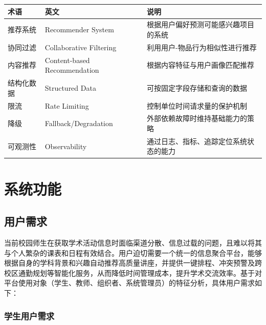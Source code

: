 \documentclass[UTF8,a4paper,12pt,fontset=none]{ctexrep}
\begin{document}
\begingroup
\small
\begin{longtable}{|>{\raggedright\arraybackslash}p{}|>{\raggedright\arraybackslash}p{}|>{\raggedright\arraybackslash}p{}|}
\hline
\textbf{术语} & \textbf{英文} & \textbf{说明} \\
\hline
推荐系统 & Recommender System & 根据用户偏好预测可能感兴趣项目的系统 \\
\hline
协同过滤 & Collaborative Filtering & 利用用户-物品行为相似性进行推荐 \\
\hline
内容推荐 & Content-based Recommendation & 根据内容特征与用户画像匹配推荐 \\
\hline
结构化数据 & Structured Data & 可按固定字段存储和查询的数据 \\
\hline
限流 & Rate Limiting & 控制单位时间请求量的保护机制 \\
\hline
降级 & Fallback/Degradation & 外部依赖故障时维持基础能力的策略 \\
\hline
可观测性 & Observability & 通过日志、指标、追踪定位系统状态的能力 \\
\hline
\end{longtable}
\endgroup

\chapter{系统功能}

\section{用户需求}

当前校园师生在获取学术活动信息时面临渠道分散、信息过载的问题，且难以将其与个人繁杂的课表和日程有效结合。用户迫切需要一个统一的信息聚合平台，能够根据自身的学科背景和兴趣自动推荐高质量讲座，并提供一键排程、冲突预警及跨校区通勤规划等智能化服务，从而降低时间管理成本，提升学术交流效率。基于对平台使用对象（学生、教师、组织者、系统管理员）的特征分析，具体用户需求如下：

\subsection{学生用户需求}
\end{document}
